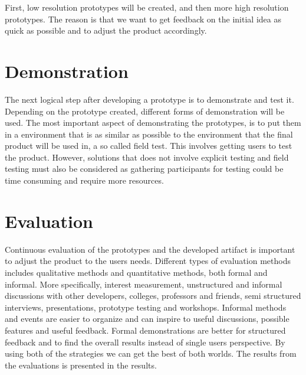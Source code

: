 \documentclass{report}
\begin{document}
First, low resolution prototypes will be created, and then more high resolution prototypes. The reason is that we want to get feedback on the initial idea as quick as possible and to adjust the product accordingly.






 
 
\section{Demonstration}

The next logical step after developing a prototype is to demonstrate and test it. Depending on the prototype created, different forms of demonstration will be used. The most important aspect of demonstrating the prototypes, is to put them in a environment that is as similar as possible to the environment that the final product will be used in, a so called field test. This involves getting users to test the product. However, solutions that does not involve explicit testing and field testing must also be considered as gathering participants for testing could be time consuming and require more resources.  
 
\section{Evaluation}
Continuous evaluation of the prototypes and the developed artifact is important to adjust the product to the users needs. Different types of evaluation methods includes qualitative methods and quantitative methods, both formal and informal. More specifically, interest measurement, unstructured and informal discussions with other developers, colleges, professors and friends, semi structured interviews, presentations, prototype testing and workshops. Informal methods and events are easier to organize and can inspire to useful discussions, possible features and useful feedback. Formal demonstrations are better for structured feedback and to find the overall results instead of single users perspective. By using both of the strategies we can get the best of both worlds. The results from the evaluations is presented in the results.
\end{document}
